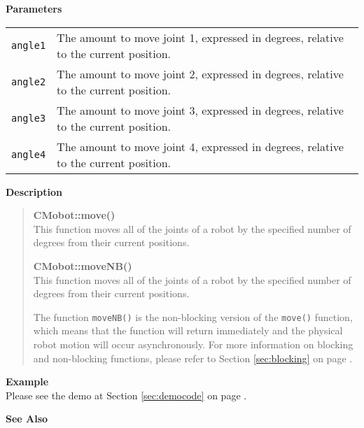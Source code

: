 \noindent
{\bf Parameters}\\
\vspace{-0.1in}
\begin{description}
\item               
\begin{tabular}{p{15 mm}p{125 mm}}
\texttt{angle1} & The amount to move joint 1, expressed in degrees, relative to the current position. \\
\texttt{angle2} & The amount to move joint 2, expressed in degrees, relative to the current position. \\
\texttt{angle3} & The amount to move joint 3, expressed in degrees, relative to the current position. \\
\texttt{angle4} & The amount to move joint 4, expressed in degrees, relative to the current position. \\
\end{tabular}
\end{description}
\noindent
{\bf Description}\\
\vspace{-12pt}
\begin{quote}
{\bf CMobot::move()}\\
This function moves all of the joints of a robot by the specified number of degrees
from their current positions. 

\noindent
{\bf CMobot::moveNB()}\\
This function moves all of the joints of a robot by the specified number of degrees
from their current positions. 

The function \texttt{moveNB()} is the non-blocking version of
the \texttt{move()} function, which means that the function will return
immediately and the physical robot motion will occur asynchronously. For 
more information on blocking and non-blocking functions, please refer to 
Section \ref{sec:blocking} on page \pageref{sec:blocking}.\\
\end{quote}
\noindent
{\bf Example}\\
Please see the demo at Section \ref{sec:democode} on page \pageref{sec:democode}.\\
\noindent

\noindent
{\bf See Also}\\

